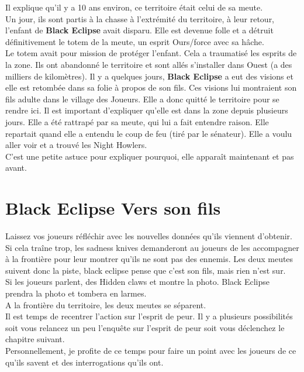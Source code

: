 \documentclass[oneside,12pt]{book}
\newcommand{\BlackEclipse}{\textbf{Black Eclipse} }
\begin{document}
\begin{flushleft}
Il explique qu'il y a 10 ans environ, ce territoire était celui de sa meute.\\
Un jour, ils sont partis à la chasse à l'extrémité du territoire, à leur retour, l'enfant de \BlackEclipse avait disparu. Elle est devenue folle et a détruit définitivement le totem de la meute, un esprit Ours/force avec sa hâche. \\
Le totem avait pour mission de protéger l'enfant. Cela a traumatisé les esprits de la zone. Ils ont abandonné le territoire et sont allés s'installer dans Ouest (a des milliers de kilomètres). Il y a quelques jours, \BlackEclipse a eut des visions et elle est retombée dans sa folie à propos de son fils. Ces visions lui montraient son fils adulte dans le village des Joueurs. Elle a donc quitté le territoire pour se rendre ici. Il est important d'expliquer qu'elle est dans la zone depuis plusieurs jours. Elle a été rattrapé par sa meute, qui lui a fait entendre raison. Elle repartait quand elle a entendu le coup de feu (tiré par le sénateur). 
Elle a voulu aller voir et a trouvé les Night Howlers. \\
C'est une petite astuce pour expliquer pourquoi, elle apparaît maintenant et pas avant.\\

\section{Black Eclipse Vers son fils}
Laissez vos joueurs réfléchir avec les nouvelles données qu'ils viennent d'obtenir. 
Si cela traîne trop, les sadness knives demanderont au joueurs de les accompagner à la frontière pour leur montrer qu'ils ne sont pas des ennemis. Les deux meutes suivent donc la piste, black eclipse pense que c'est son fils, mais rien n'est sur.\\ 
Si les joueurs parlent, des Hidden claws et montre la photo. Black Eclipse prendra la photo et tombera en larmes. \\
A la frontière du territoire,  les deux meutes se séparent.\\
Il est temps de recentrer l'action sur l'esprit de peur. Il y a plusieurs possibilités soit vous relancez un peu l'enquête sur l'esprit de peur soit vous déclenchez le chapitre suivant. \\
Personnellement, je profite de ce temps pour faire un point avec les joueurs de ce qu'ils savent et des interrogations qu'ils ont. \\




\end{flushleft}
\end{document}

